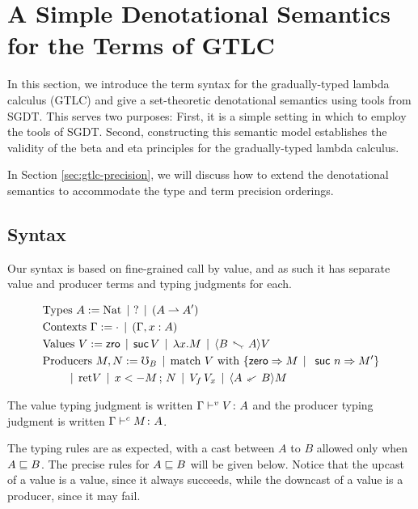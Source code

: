 \section{A Simple Denotational Semantics for the Terms of GTLC}\label{sec:gtlc-terms}


In this section, we introduce the term syntax for the gradually-typed
lambda calculus (GTLC) and give a set-theoretic denotational semantics
using tools from SGDT. This serves two purposes: First, it is a simple setting
in which to employ the tools of SGDT.
Second, constructing this semantic model establishes the validity of the
beta and eta principles for the gradually-typed lambda calculus.

In Section \ref{sec:gtlc-precision}, we will discuss how to extend the denotational
semantics to accommodate the type and term precision orderings.


\subsection{Syntax}\label{sec:term-syntax}

Our syntax is based on fine-grained call by value, and as such it has
separate value and producer terms and typing judgments for each.



\begin{align*}
  &\text{Types } A := \nat \alt \,\dyn \alt (A \ra A') \\
  &\text{Contexts } \Gamma := \cdot \alt (\Gamma, x : A) \\
  &\text{Values } V :=  \zro \alt \suc\, V \alt \lda{x}{M} \alt \up{A}{B} V \\ 
  &\text{Producers } M, N := \err_B \alt \matchnat {V} {M} {n} {M'} \\ 
  &\quad\quad \alt \ret {V} \alt \bind{x}{M}{N} \alt V_f\, V_x \alt \dn{A}{B} M 
\end{align*}


The value typing judgment is written ${\Gamma} \vdash^v {V} \colon {A}$ and 
the producer typing judgment is written ${\Gamma} \vdash^c {M} \colon {A}$.

The typing rules are as expected, with a cast between $A$ to $B$ allowed only when $A \sqsubseteq B$.
The precise rules for $A \sqsubseteq B$ will be given below.
Notice that the upcast of a value is a value, since it always succeeds, while the downcast
of a value is a producer, since it may fail.

